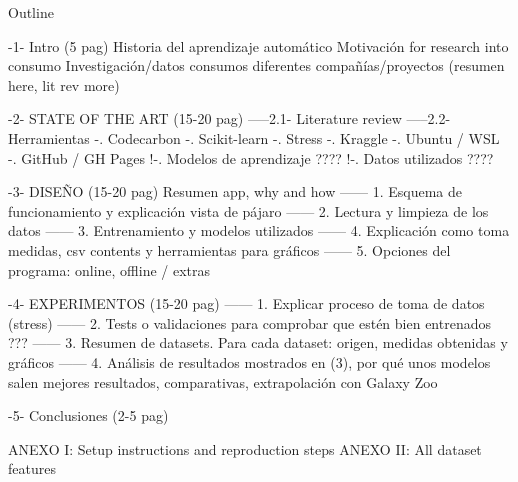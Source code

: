 Outline

-1- Intro (5 pag)
        Historia del aprendizaje automático
        Motivación for research into consumo
        Investigación/datos consumos diferentes compañías/proyectos (resumen here, lit rev more)

-2- STATE OF THE ART  (15-20 pag)
-----2.1- Literature review
-----2.2- Herramientas
        -. Codecarbon
        -. Scikit-learn
        -. Stress
        -. Kraggle
        -. Ubuntu / WSL
        -. GitHub / GH Pages
        !-. Modelos de aprendizaje ????
        !-. Datos utilizados ????

-3- DISEÑO (15-20 pag)
        Resumen app, why and how
------ 1. Esquema de funcionamiento y explicación vista de pájaro
------ 2. Lectura y limpieza de los datos
------ 3. Entrenamiento y modelos utilizados
------ 4. Explicación como toma medidas, csv contents y herramientas para gráficos
------ 5. Opciones del programa: online, offline / extras

-4- EXPERIMENTOS (15-20 pag)
------ 1. Explicar proceso de toma de datos (stress)
------ 2. Tests o validaciones para comprobar que estén bien entrenados ???
------ 3. Resumen de datasets. Para cada dataset: origen, medidas obtenidas y gráficos
------ 4. Análisis de resultados mostrados en (3), por qué unos modelos salen mejores resultados, comparativas, extrapolación con Galaxy Zoo

-5- Conclusiones (2-5 pag)

ANEXO I: Setup instructions and reproduction steps
ANEXO II: All dataset features

